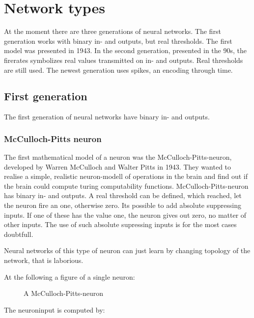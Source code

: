 \documentclass[10pt,a4paper,DIV=11]{scrreprt}
\begin{document}
\section{Network types}
At the moment there are three generations of neural networks. 
The first generation works with binary in- and outputs, but real thresholds. The first model was presented in 1943.
In the second generation, presented in the 90s, the firerates symbolizes real values transmitted on in- and outputs. Real thresholds are still used.
The newest generation uses spikes, an encoding through time.

\subsection{First generation}
The first generation of neural networks have binary in- and outputs.

\subsubsection{McCulloch-Pitts neuron}
The first mathematical model of a neuron was the McCulloch-Pitts-neuron,
developed by Warren McCulloch and Walter Pitts in 1943.
They wanted to realise a simple, realistic neuron-modell of operations in the brain and find out if the brain could compute turing computability functions.
McCulloch-Pitts-neuron has binary in- and outputs.
A real threshold can be defined, which reached, let the neuron fire an one, otherwise zero.
Its possible to add absolute suppressing inputs. If one of these has the value one, the neuron gives out zero, no matter of other inputs. The use of such absolute supressing inputs is for the most cases doubtfull.


Neural networks of this type of neuron can just learn by changing topology of the network, that is laborious.

At the following a figure of a single neuron:

\begin{figure}[H]  %
	\centering
	\caption{A McCulloch-Pitts-neuron}
	\label{fig:pitts1}
\end{figure}
The neuroninput is computed by:
\end{document}
